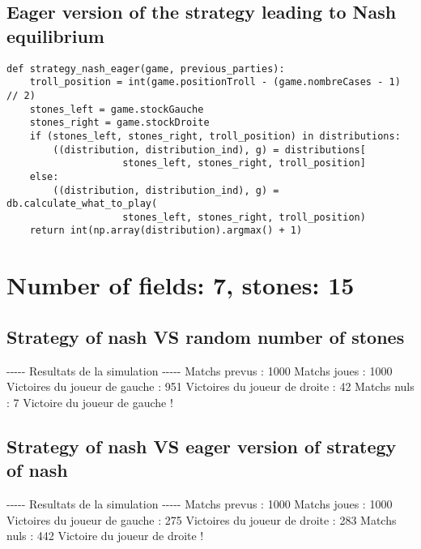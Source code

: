 \documentclass{article}%
\begin{document}
\subsection{Eager version of the strategy leading to Nash equilibrium}

\begin{verbatim}
def strategy_nash_eager(game, previous_parties):
	troll_position = int(game.positionTroll - (game.nombreCases - 1) // 2)
	stones_left = game.stockGauche
	stones_right = game.stockDroite
	if (stones_left, stones_right, troll_position) in distributions:
		((distribution, distribution_ind), g) = distributions[
					stones_left, stones_right, troll_position]
	else:
		((distribution, distribution_ind), g) = db.calculate_what_to_play(
					stones_left, stones_right, troll_position)
	return int(np.array(distribution).argmax() + 1)
\end{verbatim}

\section{Number of fields: 7, stones: 15}%
\label{sec:Number of fields 7, stones 15}%
\subsection{Strategy of nash VS random number of stones}%
\label{subsec:Strategy of nash VS random number of stones}%
{-}{-}{-}{-}{-} Resultats de la simulation {-}{-}{-}{-}{-}\newline%
		\newline%
Matchs prevus : 1000\newline%
Matchs joues : 1000\newline%
\newline%
Victoires du joueur de gauche : 951\newline%
Victoires du joueur de droite : 42\newline%
Matchs nuls : 7\newline%
\newline%
Victoire du joueur de gauche !

%
\subsection{Strategy of nash VS eager version of strategy of nash}%
\label{subsec:Strategy of nash VS eager version of strategy of nash}%
{-}{-}{-}{-}{-} Resultats de la simulation {-}{-}{-}{-}{-}\newline%
		\newline%
Matchs prevus : 1000\newline%
Matchs joues : 1000\newline%
\newline%
Victoires du joueur de gauche : 275\newline%
Victoires du joueur de droite : 283\newline%
Matchs nuls : 442\newline%
\newline%
Victoire du joueur de droite !
\end{document}
